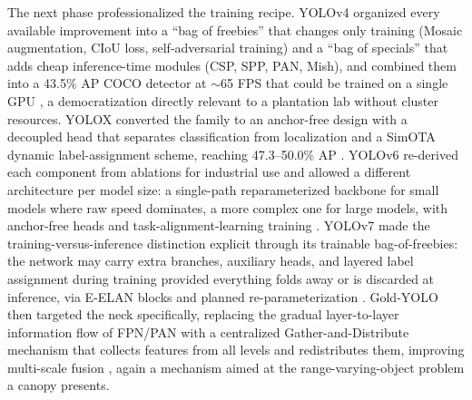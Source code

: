 The next phase professionalized the training recipe. YOLOv4 organized every available improvement into a ``bag of freebies'' that changes only training (Mosaic augmentation, CIoU loss, self-adversarial training) and a ``bag of specials'' that adds cheap inference-time modules (CSP, SPP, PAN, Mish), and combined them into a 43.5\% AP COCO detector at $\sim$65 FPS that could be trained on a single GPU \cite{bochkovskiy2020yolov4}, a democratization directly relevant to a plantation lab without cluster resources. YOLOX converted the family to an anchor-free design with a decoupled head that separates classification from localization and a SimOTA dynamic label-assignment scheme, reaching 47.3--50.0\% AP \cite{ge2021yolox}. YOLOv6 re-derived each component from ablations for industrial use and allowed a different architecture per model size: a single-path reparameterized backbone for small models where raw speed dominates, a more complex one for large models, with anchor-free heads and task-alignment-learning training \cite{li2022yolov6}. YOLOv7 made the training-versus-inference distinction explicit through its trainable bag-of-freebies: the network may carry extra branches, auxiliary heads, and layered label assignment during training provided everything folds away or is discarded at inference, via E-ELAN blocks and planned re-parameterization \cite{wang2023yolov7}. Gold-YOLO then targeted the neck specifically, replacing the gradual layer-to-layer information flow of FPN/PAN with a centralized Gather-and-Distribute mechanism that collects features from all levels and redistributes them, improving multi-scale fusion \cite{wang2023goldyolo}, again a mechanism aimed at the range-varying-object problem a canopy presents.

